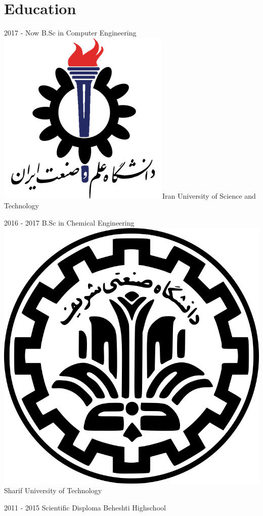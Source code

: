 \documentclass[a4paper]{friggeri-cv}
\begin{document}
\section{Education}
\begin{entrylist}
  \entry
    {2017 - Now}
    {     B.Sc in Computer Engineering}
    {\includegraphics[scale=0.06]{img/IUST_logo_color.png}Iran University of Science and Technology}
    {}

  \entry
    {2016 - 2017}
    {    B.Sc in Chemical Engineering}
    {\includegraphics[scale=0.015]{img/Sharif_logo.png} Sharif University of Technology}
    {}

  \entry
    {2011 - 2015}
    {    Scientific Disploma}
    {Beheshti Highschool}
  {}
\end{entrylist}
\end{document}
